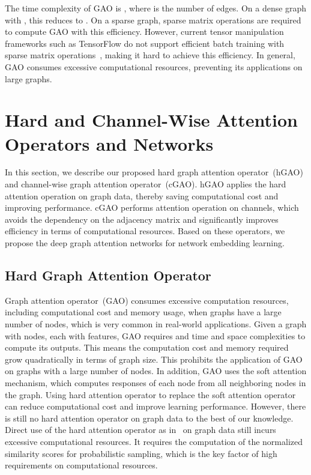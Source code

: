 \documentclass[sigconf]{acmart}
\begin{document}
The time complexity of GAO is , where  is
the number of edges. On a dense graph with , this
reduces to . On a sparse graph, sparse matrix operations
are required to compute GAO with this efficiency. However, current
tensor manipulation frameworks such as TensorFlow do not support
efficient batch training with sparse matrix
operations~\cite{velivckovic2017graph}, making it hard to achieve
this efficiency. In general, GAO consumes excessive computational
resources, preventing its applications on large graphs.







\section{Hard and Channel-Wise Attention Operators and Networks}\label{sec:networks}

In this section, we describe our proposed hard graph attention
operator~(hGAO) and channel-wise graph attention operator~(cGAO).
hGAO applies the hard attention operation on graph data, thereby
saving computational cost and improving performance. cGAO performs
attention operation on channels, which avoids the dependency on
the adjacency matrix and significantly improves efficiency
in terms of computational resources. Based on these operators, we
propose the deep graph attention networks for network embedding
learning.

\subsection{Hard Graph Attention Operator}

Graph attention operator~(GAO) consumes excessive computation
resources, including computational cost and memory usage, when
graphs have a large number of nodes, which is very common in
real-world applications. Given a graph with  nodes, each with 
features, GAO requires  and  time and space
complexities to compute its outputs. This means the computation cost
and memory required grow quadratically in terms of graph size. This
prohibits the application of GAO on graphs with a large number of
nodes. In addition, GAO uses the soft attention mechanism, which
computes responses of each node from all neighboring nodes in the
graph. Using hard attention operator to replace the soft attention
operator can reduce computational cost and improve learning
performance. However, there is still no hard attention operator on
graph data to the best of our knowledge. Direct use of the hard
attention operator as in~\cite{xu2015show} on graph data still
incurs excessive computational resources. It requires the
computation of the normalized similarity scores for probabilistic
sampling, which is the key factor of high requirements on
computational resources.
\end{document}
